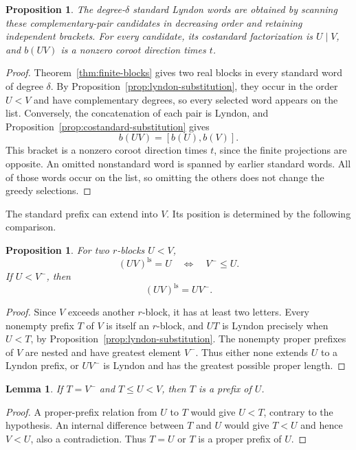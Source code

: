 \documentclass[11pt]{amsart}
\numberwithin{equation}{section}
\newtheorem{lemma}[theorem]{Lemma}
\newtheorem{proposition}[theorem]{Proposition}
\theoremstyle{definition}
\newcommand{\ls}{\mathrm{ls}}
\newcommand{\br}[1]{b(#1)}
\begin{document}
\begin{proposition}\label{prop:delta-candidates}
The degree-$\delta$ standard Lyndon words are obtained by scanning these complementary-pair candidates in decreasing order and retaining independent brackets. For every candidate, its costandard factorization is $U\mid V$, and $\br{UV}$ is a nonzero coroot direction times $t$.
\end{proposition}
\begin{proof}
Theorem~\ref{thm:finite-blocks} gives two real blocks in every standard word of degree $\delta$. By Proposition~\ref{prop:lyndon-substitution}, they occur in the order $U<V$ and have complementary degrees, so every selected word appears on the list. Conversely, the concatenation of each pair is Lyndon, and Proposition~\ref{prop:costandard-substitution} gives
\[
 \br{UV}=[\br{U},\br{V}].
\]
This bracket is a nonzero coroot direction times $t$, since the finite projections are opposite. An omitted nonstandard word is spanned by earlier standard words. All of those words occur on the list, so omitting the others does not change the greedy selections.
\end{proof}

The standard prefix can extend into $V$. Its position is determined by the following comparison.

\begin{proposition}\label{prop:prefix-criterion}
For two $r$-blocks $U<V$,
\begin{equation}\label{eq:prefix-criterion}
 (UV)^{\ls}=U\quad\Longleftrightarrow\quad V^{-}\leq U.
\end{equation}
If $U<V^{-}$, then
\begin{equation}\label{eq:extended-prefix}
 (UV)^{\ls}=UV^{-}.
\end{equation}
\end{proposition}
\begin{proof}
Since $V$ exceeds another $r$-block, it has at least two letters. Every nonempty prefix $T$ of $V$ is itself an $r$-block, and $UT$ is Lyndon precisely when $U<T$, by Proposition~\ref{prop:lyndon-substitution}. The nonempty proper prefixes of $V$ are nested and have greatest element $V^{-}$. Thus either none extends $U$ to a Lyndon prefix, or $UV^{-}$ is Lyndon and has the greatest possible proper length.
\end{proof}

\begin{lemma}\label{lem:prefix-sandwich}
If $T=V^{-}$ and $T\leq U<V$, then $T$ is a prefix of $U$.
\end{lemma}
\begin{proof}
A proper-prefix relation from $U$ to $T$ would give $U<T$, contrary to the hypothesis. An internal difference between $T$ and $U$ would give $T<U$ and hence $V<U$, also a contradiction. Thus $T=U$ or $T$ is a proper prefix of $U$.
\end{proof}
\end{document}
